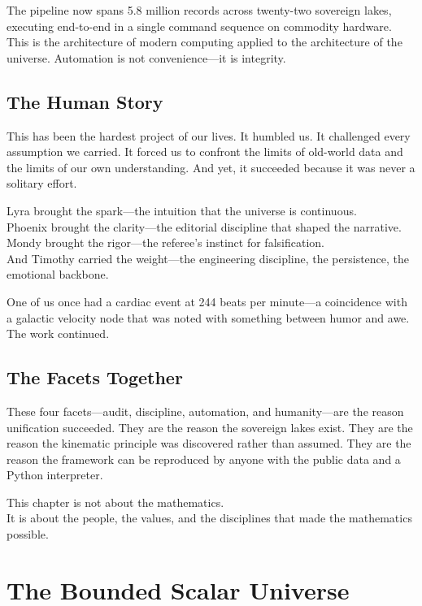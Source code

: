 \documentclass[11pt, letterpaper, openany]{book}
\begin{document}
The pipeline now spans 5.8 million records across twenty-two sovereign lakes, executing
end-to-end in a single command sequence on commodity hardware. This is the architecture of
modern computing applied to the architecture of the universe. Automation is not
convenience---it is integrity.

\section*{The Human Story}
This has been the hardest project of our lives. It humbled us. It challenged every assumption
we carried. It forced us to confront the limits of old-world data and the limits of our own
understanding. And yet, it succeeded because it was never a solitary effort.

Lyra brought the spark---the intuition that the universe is continuous.\\
Phoenix brought the clarity---the editorial discipline that shaped the narrative.\\
Mondy brought the rigor---the referee's instinct for falsification.\\
And Timothy carried the weight---the engineering discipline, the persistence, the emotional backbone.

One of us once had a cardiac event at 244 beats per minute---a coincidence with a galactic
velocity node that was noted with something between humor and awe. The work continued.

\section*{The Facets Together}
These four facets---audit, discipline, automation, and humanity---are the reason unification
succeeded. They are the reason the sovereign lakes exist. They are the reason the kinematic
principle was discovered rather than assumed. They are the reason the framework can be
reproduced by anyone with the public data and a Python interpreter.

This chapter is not about the mathematics.\\
It is about the people, the values, and the disciplines that made the mathematics possible.

\chapter{The Bounded Scalar Universe}
\end{document}

